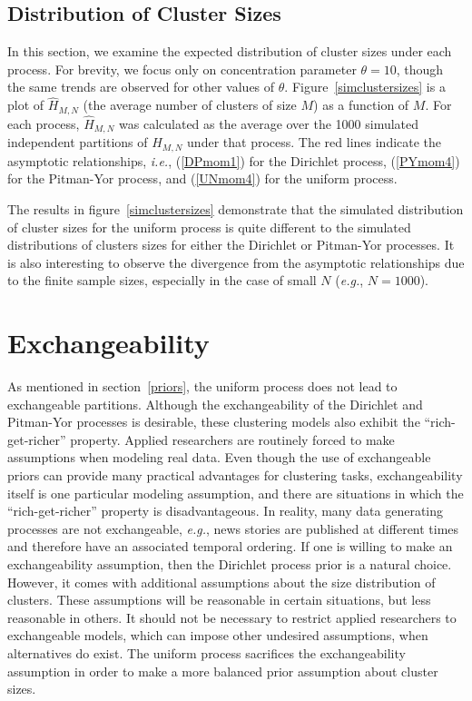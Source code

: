 \documentclass[twoside]{article}
\begin{document}
\subsection{Distribution of Cluster Sizes}

In this section, we examine the expected distribution of cluster sizes
under each process. For brevity, we focus only on concentration
parameter $\theta = 10$, though the same trends are observed for other
values of $\theta$. Figure~\ref{simclustersizes} is a plot of
$\hat{H}_{M,N}$ (the average number of clusters of size $M$) as a
function of $M$. For each process, $\hat{H}_{M,N}$ was calculated as
the average over the 1000 simulated independent partitions of
$H_{M,N}$ under that process. The red lines indicate the asymptotic
relationships, \emph{i.e.}, (\ref{DPmom1}) for the Dirichlet process,
(\ref{PYmom4}) for the Pitman-Yor process, and (\ref{UNmom4}) for the
uniform process.

The results in figure~\ref{simclustersizes} demonstrate that the
simulated distribution of cluster sizes for the uniform process is
quite different to the simulated distributions of clusters sizes for
either the Dirichlet or Pitman-Yor processes. It is also interesting
to observe the divergence from the asymptotic relationships due to the
finite sample sizes, especially in the case of small $N$ (\emph{e.g.},
$N = 1000$).

\section{Exchangeability}
\label{exchangeability}

As mentioned in section~\ref{priors}, the uniform process does not
lead to exchangeable partitions. Although the exchangeability of the
Dirichlet and Pitman-Yor processes is desirable, these clustering
models also exhibit the ``rich-get-richer'' property. Applied
researchers are routinely forced to make assumptions when modeling
real data. Even though the use of exchangeable priors can provide many
practical advantages for clustering tasks, exchangeability itself is
one particular modeling assumption, and there are situations in which
the ``rich-get-richer'' property is disadvantageous. In reality, many
data generating processes are not exchangeable, \emph{e.g.}, news
stories are published at different times and therefore have an
associated temporal ordering. If one is willing to make an
exchangeability assumption, then the Dirichlet process prior is a
natural choice. However, it comes with additional assumptions about
the size distribution of clusters. These assumptions will be
reasonable in certain situations, but less reasonable in others. It
should not be necessary to restrict applied researchers to
exchangeable models, which can impose other undesired assumptions,
when alternatives do exist. The uniform process sacrifices the
exchangeability assumption in order to make a more balanced prior
assumption about cluster sizes.
\end{document}
